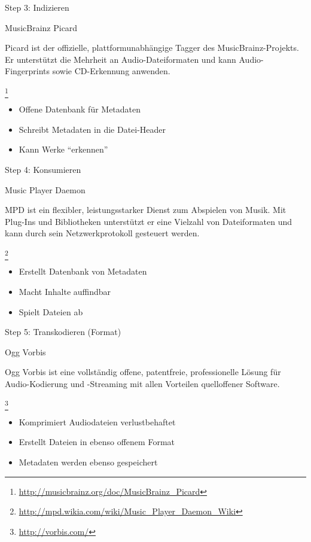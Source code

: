 \documentclass[aspectratio=1610]{beamer}
\newcommand{\src}[1]{
  \raggedright{
    \footnote{
      \small{\url{#1}}
    }
  }
}
\newcommand{\concept}[2]{
  \footnotesize{
    \begin{block}{#1}
      \pause
      #2
    \end{block}
  }
}
\begin{document}
  \begin{frame}{Step 3: Indizieren}
    \concept{MusicBrainz Picard}{
      Picard ist der offizielle, plattformunabhängige Tagger des
      MusicBrainz-Projekts. Er unterstützt die Mehrheit an Audio-Dateiformaten
      und kann Audio-Fingerprints sowie CD-Erkennung anwenden.
      \src{http://musicbrainz.org/doc/MusicBrainz\_Picard}
    }
    \begin{itemize}
      \pause
      \item Offene Datenbank für Metadaten
      \pause
      \item Schreibt Metadaten in die Datei-Header
      \pause
      \item Kann Werke “erkennen”
    \end{itemize}
  \end{frame}

  \begin{frame}{Step 4: Konsumieren}
    \concept{Music Player Daemon}{
      MPD ist ein flexibler, leistungsstarker Dienst zum Abspielen von Musik.
      Mit Plug-Ins und Bibliotheken unterstützt er eine Vielzahl von
      Dateiformaten und kann durch sein Netzwerkprotokoll gesteuert werden.
      \src{http://mpd.wikia.com/wiki/Music\_Player\_Daemon\_Wiki}
    }
    \begin{itemize}
      \pause
      \item Erstellt Datenbank von Metadaten
      \pause
      \item Macht Inhalte auffindbar
      \pause
      \item Spielt Dateien ab
    \end{itemize}
  \end{frame}

  \begin{frame}{Step 5: Transkodieren (Format)}
    \concept{Ogg Vorbis}{
      Ogg Vorbis ist eine vollständig offene, patentfreie, professionelle Lösung
      für Audio-Kodierung und -Streaming mit allen Vorteilen quelloffener
      Software.
      \src{http://vorbis.com/}
    }
    \begin{itemize}
      \pause
      \item Komprimiert Audiodateien verlustbehaftet
      \pause
      \item Erstellt Dateien in ebenso offenem Format
      \pause
      \item Metadaten werden ebenso gespeichert
    \end{itemize}
  \end{frame}
\end{document}
